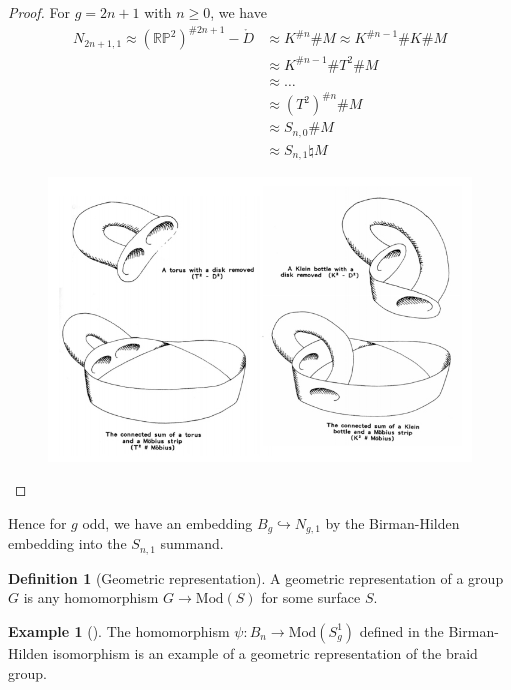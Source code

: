 \documentclass[reqno]{amsart}
\theoremstyle{definition}
\newtheorem{definition}[theorem]{Definition}
\newtheorem{example}[theorem]{Example}
\theoremstyle{remark}
\newcommand{\Mod}{{\mathrm{Mod}}}
\begin{document}
\begin{proof}

For $g = 2n+1$ with $n\ge 0$, we have
\begin{align*}
N_{2n+1,1} \approx
\left( \mathbb{R}\mathbb{P}^2 \right)^{\# 2n+1} -
\mathring{D} 
&\approx K^{\# n} \# M
\approx K^{\# n-1} \# K \# M\\
&\approx K^{\# n-1} \# T^2 \# M\\
&\approx \ldots\\
&\approx \left( T^2 \right)^{\# n} \# M\\
&\approx S_{n,0} \# M\\
&\approx S_{n,1} \natural M
\end{align*}

\begin{figure}[H]
    \centering
    \includegraphics[width=1\textwidth]{N_3,1.jpg}
    \label{fig:N_3-1-jpg}
\end{figure}


\end{proof}

Hence for $g$ odd, we have an embedding
$B_{g} \hookrightarrow N_{g,1}$ by the Birman-Hilden
embedding into the $S_{n,1}$ summand.

\begin{definition}[Geometric representation]
    A geometric representation of a group $G$ is any
    homomorphism $G \to \Mod (S)$ for some
    surface $S$.
\end{definition}

\begin{example}[]
    The homomorphism $\psi  \colon B_n \to \Mod(S_{g}^{1})$ 
    defined in the Birman-Hilden isomorphism is an
    example of a geometric representation of the braid group.
\end{example}
\end{document}
